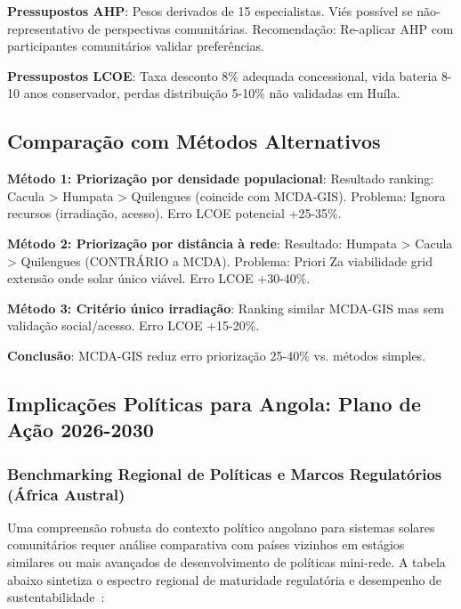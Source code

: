 \documentclass[12pt, a4paper]{article}
\begin{document}
{{{{{{{{{{{{{\textbf{Pressupostos AHP}: Pesos derivados de 15 especialistas. Viés possível se não-representativo de perspectivas comunitárias. Recomendação: Re-aplicar AHP com participantes comunitários validar preferências.

\textbf{Pressupostos LCOE}: Taxa desconto 8\% adequada concessional, vida bateria 8-10 anos conservador, perdas distribuição 5-10\% não validadas em Huíla.

\subsection{Comparação com Métodos Alternativos}

\textbf{Método 1: Priorização por densidade populacional}: Resultado ranking: Cacula > Humpata > Quilengues (coincide com MCDA-GIS). Problema: Ignora recursos (irradiação, acesso). Erro LCOE potencial +25-35\%.

\textbf{Método 2: Priorização por distância à rede}: Resultado: Humpata > Cacula > Quilengues (CONTRÁRIO a MCDA). Problema: Priori Za viabilidade grid extensão onde solar único viável. Erro LCOE +30-40\%.

\textbf{Método 3: Critério único irradiação}: Ranking similar MCDA-GIS mas sem validação social/acesso. Erro LCOE +15-20\%.

\textbf{Conclusão}: MCDA-GIS reduz erro priorização 25-40\% vs. métodos simples.

\subsection{Implicações Políticas para Angola: Plano de Ação 2026-2030}

\subsubsection{Benchmarking Regional de Políticas e Marcos Regulatórios (África Austral)}

Uma compreensão robusta do contexto político angolano para sistemas solares comunitários requer análise comparativa com países vizinhos em estágios similares ou mais avançados de desenvolvimento de políticas mini-rede. A tabela abaixo sintetiza o espectro regional de maturidade regulatória e desempenho de sustentabilidade~\citep{Chirwa2024}:

}}}}}}}}}}}}}
\end{document}
